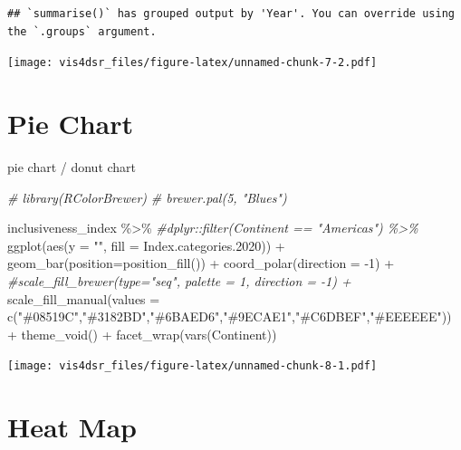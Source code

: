 \documentclass[
]{krantz}
\makeatletter
\newenvironment{Shaded}{\begin{snugshade}}{\end{snugshade}}
\newcommand{\AttributeTok}[1]{\textcolor[rgb]{0.61,0.61,0.61}{#1}}
\newcommand{\CommentTok}[1]{\textcolor[rgb]{0.37,0.37,0.37}{\textit{#1}}}
\newcommand{\DecValTok}[1]{\textcolor[rgb]{0.06,0.06,0.06}{#1}}
\newcommand{\FloatTok}[1]{\textcolor[rgb]{0.06,0.06,0.06}{#1}}
\newcommand{\FunctionTok}[1]{\textcolor[rgb]{0,0,0}{#1}}
\newcommand{\NormalTok}[1]{#1}
\newcommand{\SpecialCharTok}[1]{\textcolor[rgb]{0,0,0}{#1}}
\newcommand{\StringTok}[1]{\textcolor[rgb]{0.5,0.5,0.5}{#1}}
\newenvironment{kframe}{%
\medskip{}
\setlength{\fboxsep}{.8em}
 \def\at@end@of@kframe{}%
 \ifinner\ifhmode%
  \def\at@end@of@kframe{\end{minipage}}%
  \begin{minipage}{\columnwidth}%
 \fi\fi%
 \def\FrameCommand##1{\hskip\@totalleftmargin \hskip-\fboxsep
 \colorbox{shadecolor}{##1}\hskip-\fboxsep
     \hskip-\linewidth \hskip-\@totalleftmargin \hskip\columnwidth}%
 \MakeFramed {\advance\hsize-\width
   \@totalleftmargin\z@ \linewidth\hsize
   \@setminipage}}%
 {\par\unskip\endMakeFramed%
 \at@end@of@kframe}
\renewenvironment{Shaded}{\begin{kframe}}{\end{kframe}}
\makeatother
\begin{document}
\begin{verbatim}
## `summarise()` has grouped output by 'Year'. You can override using the `.groups` argument.
\end{verbatim}

\texttt{[image: vis4dsr\_files/figure-latex/unnamed-chunk-7-2.pdf]}

\hypertarget{pie-chart}{%
\section{Pie Chart}\label{pie-chart}}

pie chart / donut chart

\begin{Shaded}
\begin{Highlighting}[]
\CommentTok{\# library(RColorBrewer)}
\CommentTok{\# brewer.pal(5, "Blues")}

\NormalTok{inclusiveness\_index }\SpecialCharTok{\%\textgreater{}\%}
  \CommentTok{\#dplyr::filter(Continent == "Americas") \%\textgreater{}\%}
  \FunctionTok{ggplot}\NormalTok{(}\FunctionTok{aes}\NormalTok{(}\AttributeTok{y =} \StringTok{""}\NormalTok{, }\AttributeTok{fill =}\NormalTok{ Index.categories}\FloatTok{.2020}\NormalTok{)) }\SpecialCharTok{+}
    \FunctionTok{geom\_bar}\NormalTok{(}\AttributeTok{position=}\FunctionTok{position\_fill}\NormalTok{()) }\SpecialCharTok{+}
    \FunctionTok{coord\_polar}\NormalTok{(}\AttributeTok{direction =} \SpecialCharTok{{-}}\DecValTok{1}\NormalTok{) }\SpecialCharTok{+}
    \CommentTok{\#scale\_fill\_brewer(type="seq", palette = 1, direction = {-}1) +}
    \FunctionTok{scale\_fill\_manual}\NormalTok{(}\AttributeTok{values =} \FunctionTok{c}\NormalTok{(}\StringTok{"\#08519C"}\NormalTok{,}\StringTok{"\#3182BD"}\NormalTok{,}\StringTok{"\#6BAED6"}\NormalTok{,}\StringTok{"\#9ECAE1"}\NormalTok{,}\StringTok{"\#C6DBEF"}\NormalTok{,}\StringTok{"\#EEEEEE"}\NormalTok{)) }\SpecialCharTok{+}
    \FunctionTok{theme\_void}\NormalTok{() }\SpecialCharTok{+}
    \FunctionTok{facet\_wrap}\NormalTok{(}\FunctionTok{vars}\NormalTok{(Continent))}
\end{Highlighting}
\end{Shaded}

\texttt{[image: vis4dsr\_files/figure-latex/unnamed-chunk-8-1.pdf]}

\hypertarget{heat-map}{%
\section{Heat Map}\label{heat-map}}
\end{document}
